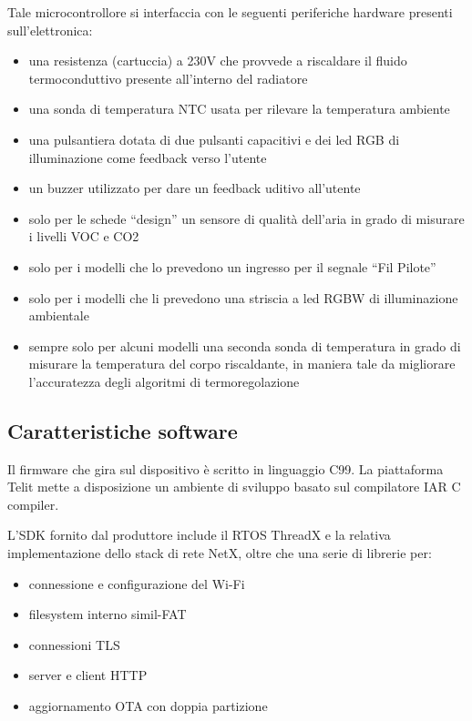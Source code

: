 \documentclass{article}
\begin{document}
Tale microcontrollore si interfaccia con le seguenti periferiche hardware presenti
sull'elettronica:

\begin{itemize}
    \item una resistenza (cartuccia) a 230V che provvede a riscaldare il fluido
        termoconduttivo presente all'interno del radiatore
    \item una sonda di temperatura NTC usata per rilevare la temperatura ambiente
    \item una pulsantiera dotata di due pulsanti capacitivi e dei led RGB di illuminazione
        come feedback verso l'utente
    \item un buzzer utilizzato per dare un feedback uditivo all'utente
    \item solo per le schede ``design'' un sensore di qualità dell'aria in grado di
        misurare i livelli VOC e CO2
    \item solo per i modelli che lo prevedono un ingresso per il segnale ``Fil Pilote''
    \item solo per i modelli che li prevedono una striscia a led RGBW di illuminazione ambientale
    \item sempre solo per alcuni modelli una seconda sonda di temperatura in grado di
        misurare la temperatura del corpo riscaldante, in maniera tale da migliorare
        l'accuratezza degli algoritmi di termoregolazione
\end{itemize}

\subsection{Caratteristiche software}

Il firmware che gira sul dispositivo è scritto in linguaggio C99. La piattaforma
Telit mette a disposizione un ambiente di sviluppo basato sul compilatore IAR C
compiler.

L'SDK fornito dal produttore include il RTOS ThreadX e la relativa
implementazione dello stack di rete NetX, oltre che una serie di librerie per:

\begin{itemize}
    \item connessione e configurazione del Wi-Fi
    \item filesystem interno simil-FAT
    \item connessioni TLS
    \item server e client HTTP
    \item aggiornamento OTA con doppia partizione
\end{itemize}
\end{document}
